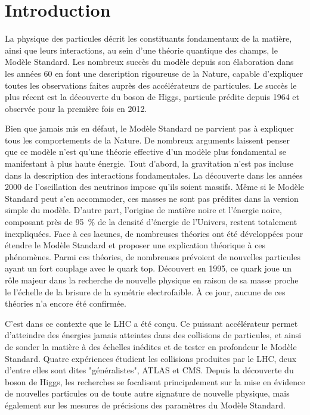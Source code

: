\chapter*{Introduction}


La physique des particules décrit les constituants fondamentaux de la matière, ainsi que leurs interactions, au sein d'une théorie quantique des champs, le Modèle Standard. Les nombreux succès du modèle depuis son élaboration dans les années 60 en font une description rigoureuse de la Nature, capable d'expliquer toutes les observations faites auprès des accélérateurs de particules. Le succès le plus récent est la découverte du boson de Higgs, particule prédite depuis 1964 et observée pour la première fois en 2012.

Bien que jamais mis en défaut, le Modèle Standard ne parvient pas à expliquer tous les comportements de la Nature. De nombreux arguments laissent penser que ce modèle n'est qu'une théorie effective d'un modèle plus fondamental se manifestant à plus haute énergie. Tout d'abord, la gravitation n'est pas incluse dans la description des interactions fondamentales. La découverte dans les années 2000 de l'oscillation des neutrinos impose qu'ils soient massifs. Même si le Modèle Standard peut s'en accommoder, ces masses ne sont pas prédites dans la version simple du modèle. D'autre part, l'origine de matière noire et l'énergie noire, composant près de \SI{95}{\percent} de la densité d'énergie de l'Univers, restent totalement inexpliquées. Face à ces lacunes, de nombreuses théories ont été développées pour étendre le Modèle Standard et proposer une explication théorique à ces phénomènes. Parmi ces théories, de nombreuses prévoient de nouvelles particules ayant un fort couplage avec le quark top. Découvert en 1995, ce quark joue un rôle majeur dans la recherche de nouvelle physique en raison de sa masse proche le l’échelle de la brisure de la symétrie electrofaible. À ce jour, aucune de ces théories n'a encore été confirmée.

\smallskip

C'est dans ce contexte que le LHC a été conçu. Ce puissant accélérateur permet d'atteindre des énergies jamais atteintes dans des collisions de particules, et ainsi de sonder la matière à des échelles inédites et de tester en profondeur le Modèle Standard. Quatre expériences étudient les collisions produites par le LHC, deux d'entre elles sont dites "généralistes", ATLAS et CMS. Depuis la découverte du boson de Higgs, les recherches se focalisent principalement sur la mise en évidence de nouvelles particules ou de toute autre signature de nouvelle physique, mais également sur les mesures de précisions des paramètres du Modèle Standard.

